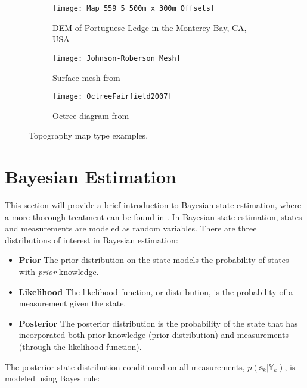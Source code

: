 \begin{figure} [H]	
  	\centering
	\begin{subfigure}[b]{0.8\textwidth}
                \texttt{[image: Map\_559\_5\_500m\_x\_300m\_Offsets]}
		\caption{DEM of Portuguese Ledge in the Monterey Bay, CA, USA}
		\label{fig:topographyDEM}
  	\end{subfigure}
  	
  	\centering
	\begin{subfigure}[b]{0.63\textwidth}
                \texttt{[image: Johnson-Roberson\_Mesh]}
		\caption{Surface mesh from \cite{JohnsonRoberson2010}}
		\label{fig:topographyMesh}
  	\end{subfigure}
  	\centering
	\begin{subfigure}[b]{0.33\textwidth}
                \texttt{[image: OctreeFairfield2007]}
		\caption{Octree diagram from \cite{Fairfield2007}}
		\label{fig:topographyOctree}
  	\end{subfigure} 	
	\caption{Topography map type examples.}
	\label{fig:topographyTypes}
\end{figure}

\section{Bayesian Estimation}
\label{framework.Bayesian}

This section will provide a brief introduction to Bayesian state estimation, where a more thorough treatment can be found in \cite{Thrun2005}.
In Bayesian state estimation, states and measurements are modeled as random variables.
There are three distributions of interest in Bayesian estimation:

\begin{itemize}
\item \textbf{Prior} The prior distribution on the state models the probability of states with \emph{prior} knowledge. 
\item \textbf{Likelihood} The likelihood function, or distribution, is the probability of a measurement given the state.
\item \textbf{Posterior} The posterior distribution is the probability of the state that has incorporated both prior knowledge (prior distribution) and measurements (through the likelihood function).
\end{itemize}

The posterior state distribution conditioned on all measurements, $p(\mathbf{s}_k|\mathbb{Y}_k)$, is modeled using Bayes rule:

